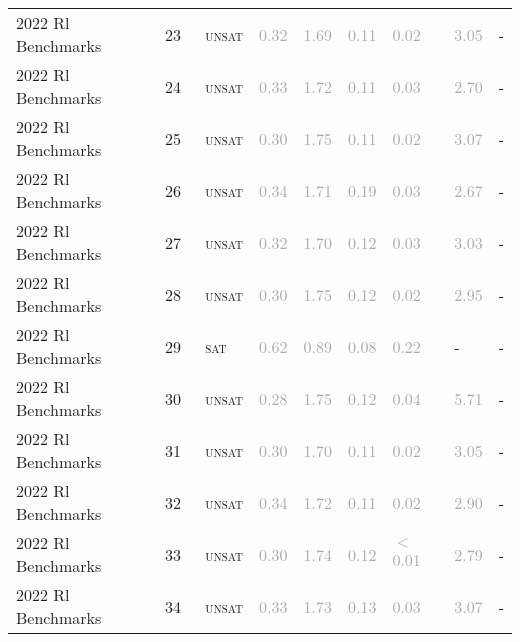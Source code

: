 \begin{center}
{\begin{longtable}{@{}lllllllll@{}}
2022 Rl Benchmarks & 23 & ~\textsc{unsat} & \textcolor{darkgray}{0.32} & \textcolor{darkgray}{1.69} & \textcolor{darkgray}{0.11} & \textcolor{darkgray}{0.02} & \textcolor{darkgray}{3.05} & - \\
2022 Rl Benchmarks & 24 & ~\textsc{unsat} & \textcolor{darkgray}{0.33} & \textcolor{darkgray}{1.72} & \textcolor{darkgray}{0.11} & \textcolor{darkgray}{0.03} & \textcolor{darkgray}{2.70} & - \\
2022 Rl Benchmarks & 25 & ~\textsc{unsat} & \textcolor{darkgray}{0.30} & \textcolor{darkgray}{1.75} & \textcolor{darkgray}{0.11} & \textcolor{darkgray}{0.02} & \textcolor{darkgray}{3.07} & - \\
2022 Rl Benchmarks & 26 & ~\textsc{unsat} & \textcolor{darkgray}{0.34} & \textcolor{darkgray}{1.71} & \textcolor{darkgray}{0.19} & \textcolor{darkgray}{0.03} & \textcolor{darkgray}{2.67} & - \\
2022 Rl Benchmarks & 27 & ~\textsc{unsat} & \textcolor{darkgray}{0.32} & \textcolor{darkgray}{1.70} & \textcolor{darkgray}{0.12} & \textcolor{darkgray}{0.03} & \textcolor{darkgray}{3.03} & - \\
2022 Rl Benchmarks & 28 & ~\textsc{unsat} & \textcolor{darkgray}{0.30} & \textcolor{darkgray}{1.75} & \textcolor{darkgray}{0.12} & \textcolor{darkgray}{0.02} & \textcolor{darkgray}{2.95} & - \\
2022 Rl Benchmarks & 29 & ~\textsc{sat} & \textcolor{darkgray}{0.62} & \textcolor{darkgray}{0.89} & \textcolor{darkgray}{0.08} & \textcolor{darkgray}{0.22} & - & - \\
2022 Rl Benchmarks & 30 & ~\textsc{unsat} & \textcolor{darkgray}{0.28} & \textcolor{darkgray}{1.75} & \textcolor{darkgray}{0.12} & \textcolor{darkgray}{0.04} & \textcolor{darkgray}{5.71} & - \\
2022 Rl Benchmarks & 31 & ~\textsc{unsat} & \textcolor{darkgray}{0.30} & \textcolor{darkgray}{1.70} & \textcolor{darkgray}{0.11} & \textcolor{darkgray}{0.02} & \textcolor{darkgray}{3.05} & - \\
2022 Rl Benchmarks & 32 & ~\textsc{unsat} & \textcolor{darkgray}{0.34} & \textcolor{darkgray}{1.72} & \textcolor{darkgray}{0.11} & \textcolor{darkgray}{0.02} & \textcolor{darkgray}{2.90} & - \\
2022 Rl Benchmarks & 33 & ~\textsc{unsat} & \textcolor{darkgray}{0.30} & \textcolor{darkgray}{1.74} & \textcolor{darkgray}{0.12} & \textcolor{darkgray}{$<$0.01} & \textcolor{darkgray}{2.79} & - \\
2022 Rl Benchmarks & 34 & ~\textsc{unsat} & \textcolor{darkgray}{0.33} & \textcolor{darkgray}{1.73} & \textcolor{darkgray}{0.13} & \textcolor{darkgray}{0.03} & \textcolor{darkgray}{3.07} & - \\

\end{longtable}}
\end{center}
